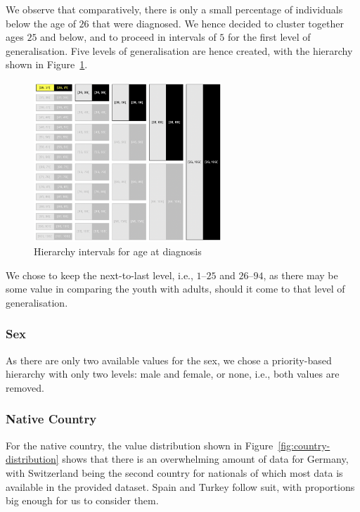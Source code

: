 \documentclass[parskip=half]{scrartcl}
\newcommand\figref{Figure~\ref}
\begin{document}
We observe that comparatively, there is only a small percentage of individuals
below the age of $26$ that were diagnosed. We hence decided to cluster together
ages $25$ and below, and to proceed in intervals of $5$ for the first level of
generalisation. Five levels of generalisation are hence created, with the
hierarchy shown in \figref{fig:age-intervals}.

\begin{figure}[ht]
    \begin{center}
        \includegraphics[width=200pt]{age_clusters}
        \caption{Hierarchy intervals for age at diagnosis}
        \label{fig:age-intervals}
    \end{center}
\end{figure}

We chose to keep the next-to-last level, i.e., $1$--$25$ and $26$--$94$, as
there may be some value in comparing the youth with adults, should it come to
that level of generalisation.

\subsubsection{Sex}

As there are only two available values for the sex, we chose a priority-based
hierarchy with only two levels: male and female, or none, i.e., both values are
removed.

\subsubsection{Native Country}

For the native country, the value distribution shown in
\figref{fig:country-distribution} shows that there is an overwhelming amount of
data for Germany, with Switzerland being the second country for nationals of
which most data is available in the provided dataset. Spain and Turkey follow
suit, with proportions big enough for us to consider them.
\end{document}
